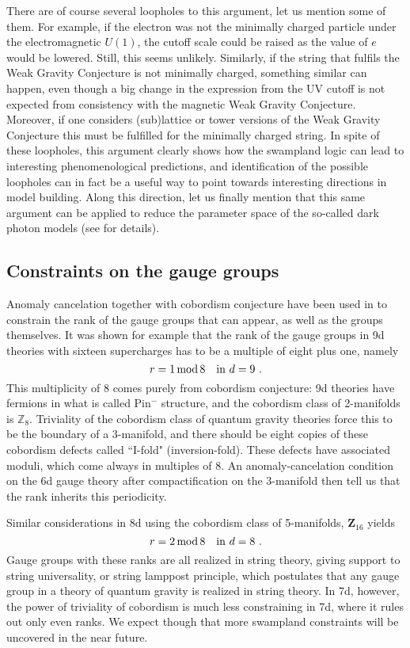 \documentclass[11pt,a4paper]{article}
\def\be{\begin{equation}}
\def\ee{\end{equation}}
\begin{document}
There are of course several loopholes to this argument, let us mention some of them. For example, if the electron was not the minimally charged particle under the electromagnetic $U(1)$, the cutoff scale could be raised as the value of $e$ would be lowered. Still, this seems unlikely. Similarly, if the string that fulfils the Weak Gravity Conjecture is not minimally charged, something similar can happen, even though a big change in the expression from the UV cutoff is not expected from consistency with the magnetic Weak Gravity Conjecture. Moreover, if one considers (sub)lattice or tower versions of the Weak Gravity Conjecture this must be fulfilled for the minimally charged string.
In spite of these loopholes, this argument clearly shows how the swampland logic can lead to interesting phenomenological predictions, and identification of the possible loopholes can in fact be a useful way to point towards interesting directions in model building. Along this direction, let us finally mention that this same argument can be applied to reduce the parameter space of the so-called dark photon models (see \cite{Reece:2018zvv} for details).


\subsection{Constraints on the gauge groups}
Anomaly cancelation together with cobordism conjecture have been used in  \cite{Montero:2020icj} to constrain the rank of the gauge groups that can appear, as well as the groups themselves. It was shown for example that the rank of the gauge groups in 9d theories with sixteen supercharges has to be a multiple of eight plus one, namely
\be
r=1 \, {\rm mod} \, 8 \quad {\rm in} \ d=9 \ .
\ee
This multiplicity of 8 comes purely from cobordism conjecture: 9d theories have fermions in what is called Pin$^-$ structure, and the cobordism class of 2-manifolds is ${\mathbb Z}_8$. Triviality of the cobordism class of quantum gravity theories force this to be the boundary of a 3-manifold, and there should be eight copies of these  
cobordism defects called ``I-fold" (inversion-fold). These defects have associated moduli, which come always in multiples of 8. An anomaly-cancelation condition on the 6d gauge theory after compactification on the 3-manifold then tell us that the rank inherits this periodicity. 

Similar considerations in 8d using the cobordism class of 5-manifolds, ${\mathbf Z}_{16}$ yields
\be
r=2 \, {\rm mod} \, 8 \quad {\rm in} \ d=8 \ .
\ee
Gauge groups with these ranks are all realized in string theory, giving support to string universality, or string lamppost principle, which postulates that any gauge group in a theory of quantum gravity is realized in string theory. In 7d, however, the power of triviality of cobordism  is much less constraining in 7d, where it rules out only even ranks. We expect though that more swampland constraints will be uncovered in the near future.  
\end{document}

